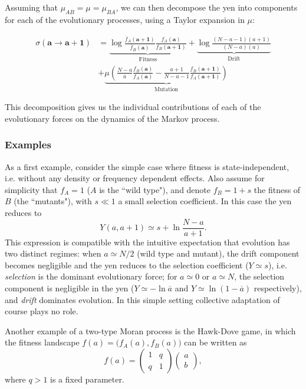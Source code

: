 \documentclass[aps,prd,11pt,notitlepage,nofootinbib,superscriptaddress,showkeys,letterpaper]{revtex4-1}
\begin{document}
Assuming that $\mu_{AB} = \mu = \mu_{BA}$, we can then decompose the yen into components for each
of the evolutionary processes, using a Taylor expansion in $\mu$:

\begin{align*} 
\sigma(\mathbf{a} \to \mathbf{a+1}) &= \underbrace{\log{\frac{\bar{f}_A(\mathbf{a+1})}{\bar{f}_{B}(\mathbf{a})}}\frac{f_A(\mathbf{a})}{f_B(\mathbf{a+1})}}_{\text{Fitness}}
 + \underbrace{\log{ \frac{(N - a - 1)(a+1)}{(N - a)(a)} } }_{\text{Drift}} \\
 &+ \underbrace{\mu \left( \frac{N-a}{a} \frac{f_B(\mathbf{a})}{f_A(\mathbf{a})} - \frac{a+1}{N-a-1} \frac{f_B(\mathbf{a+1})}{f_A(\mathbf{a+1})} \right)  }_{\text{Mutation}} 
\end{align*}


This decomposition gives us the individual contributions of each of the evolutionary
forces on the dynamics of the Markov process.


\subsubsection{Examples}

As a first example, consider the simple case where fitness is state-independent, i.e. without any density or frequency dependent effects. Also assume for simplicity that $f_A=1$ ($A$ is the ``wild type"), and denote $f_B=1+s$ the fitness of $B$ (the ``mutants"), with $s\ll 1$ a small selection coefficient. In this case the yen reduces to 
\begin{equation}
        Y(a,a+1)\simeq s+\ln \frac{N-a}{a+1}.
\end{equation}
This expression is compatible with the intuitive expectation that evolution has two distinct regimes: when $a\simeq N/2$ (wild type and mutant), the drift component becomes negligible and the yen reduces to the selection coefficient ($Y\simeq s$), i.e. \textit{selection} is the dominant evolutionary force; for $a\simeq 0$ or $a\simeq N$, the selection component is negligible in the yen ($Y\simeq -\ln \overline{a}$ and $Y\simeq \ln (1-\overline{a})$ respectively), and \textit{drift} dominates evolution. In this simple setting collective adaptation of course plays no role.

Another example of a two-type Moran process is the Hawk-Dove game, in which the fitness landscape $f(a)=\big(f_A(a),f_B(a)\big)$ can be written as 
\begin{equation}
        f(a)=\begin{pmatrix}
                1 & q\\
                q & 1
        \end{pmatrix}\begin{pmatrix}
                a\\
                b
        \end{pmatrix},
\end{equation} 
where $q>1$ is a fixed parameter. 
\end{document}
